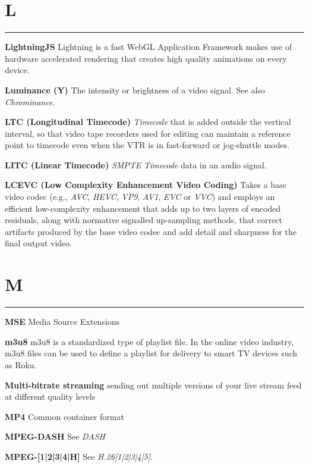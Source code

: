 \section{L}
\hrule

\medskip
\textbf{LightningJS}
Lightning is a fast WebGL Application Framework makes use of hardware accelerated rendering that creates high quality animations on every device.

\smallskip
\textbf{Luminance (Y)}
The intensity or brightness of a video signal. See also \textit{Chrominance}.

\smallskip
\textbf{LTC (Longitudinal Timecode)}
\textit{Timecode} that is added outside the vertical interval, so that video tape recorders used for editing can maintain a reference point to timecode even when the VTR is in fast-forward or jog-shuttle modes.

\smallskip
\textbf{LITC (Linear Timecode)}
\textit{SMPTE} \textit{Timecode} data in an audio signal.

\smallskip
\textbf{LCEVC (Low Complexity Enhancement Video Coding)}
Takes a base video codec (e.g., \textit{AVC}, \textit{HEVC}, \textit{VP9}, \textit{AV1}, \textit{EVC} or \textit{VVC}) and employs an efficient low-complexity enhancement that adds up to two layers of encoded residuals, along with normative signalled up-sampling methods, that correct artifacts produced by the base video codec and add detail and sharpness for the final output video.


\section{M}
\hrule

\medskip
\textbf{MSE}
Media Source Extensions

\smallskip
\textbf{m3u8}
m3u8 is a standardized type of playlist file. In the online video industry, m3u8 files can be used to define a playlist for delivery to smart TV devices such as Roku.

\smallskip
\textbf{Multi-bitrate streaming}
sending out multiple versions of your live stream feed at different quality levels

\smallskip
\textbf{MP4}
Common container format

\smallskip
\textbf{MPEG-DASH}
See \textit{DASH}

\smallskip
\textbf{MPEG-[1|2|3|4|H]}
See \textit{H.26[1|2|3|4|5]}.

